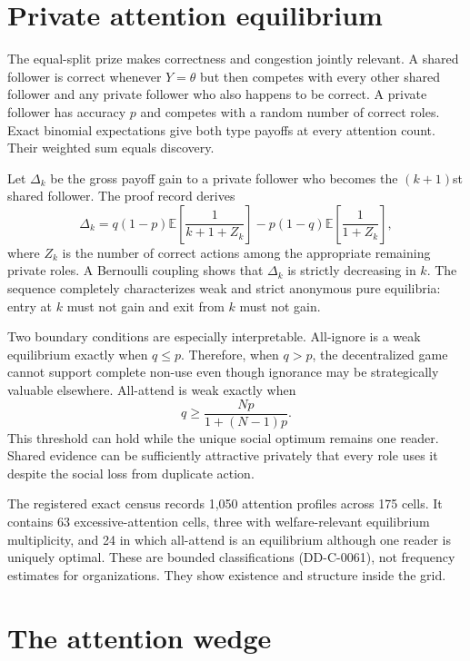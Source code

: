 \documentclass[11pt]{article}
\newcommand{\E}{\mathbb{E}}
\begin{document}


\section{Private attention equilibrium}

The equal-split prize makes correctness and congestion jointly relevant. A
shared follower is correct whenever $Y=\theta$ but then competes with every
other shared follower and any private follower who also happens to be correct.
A private follower has accuracy $p$ and competes with a random number of correct
roles. Exact binomial expectations give both type payoffs at every attention
count. Their weighted sum equals discovery.

Let $\Delta_k$ be the gross payoff gain to a private follower who becomes the
$(k+1)$st shared follower. The proof record derives
\[
 \Delta_k=q(1-p)\E\left[\frac{1}{k+1+Z_k}\right]
 -p(1-q)\E\left[\frac{1}{1+Z_k}\right],
\]
where $Z_k$ is the number of correct actions among the appropriate remaining
private roles. A Bernoulli coupling shows that $\Delta_k$ is strictly decreasing
in $k$. The sequence completely characterizes weak and strict anonymous pure
equilibria: entry at $k$ must not gain and exit from $k$ must not gain.

Two boundary conditions are especially interpretable. All-ignore is a weak
equilibrium exactly when $q\leq p$. Therefore, when $q>p$, the decentralized
game cannot support complete non-use even though ignorance may be strategically
valuable elsewhere. All-attend is weak exactly when
\[
 q\geq \frac{Np}{1+(N-1)p}.
\]
This threshold can hold while the unique social optimum remains one reader.
Shared evidence can be sufficiently attractive privately that every role uses
it despite the social loss from duplicate action.

The registered exact census records 1,050 attention profiles across 175 cells.
It contains 63 excessive-attention cells, three with welfare-relevant
equilibrium multiplicity, and 24 in which all-attend is an equilibrium although
one reader is uniquely optimal. These are bounded classifications (DD-C-0061),
not frequency estimates for organizations. They show existence and structure
inside the grid.



\section{The attention wedge}
\end{document}
